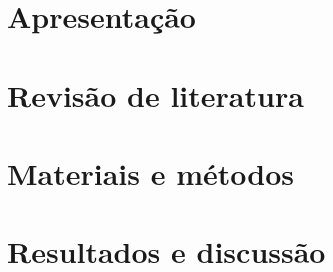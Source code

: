 \documentclass[
	12pt,				%
	openright,			%
	twoside,			%
	a4paper,			%
	english,			%
	brazil				%
	]{abntex2}
\begin{document}
\tableofcontents*
\cleardoublepage


\textual

\part{Apresentação}



\part{Revisão de literatura}







\part{Materiais e métodos}



\part{Resultados e discussão}




\postextual



% 

%


%


\printindex
\end{document}
